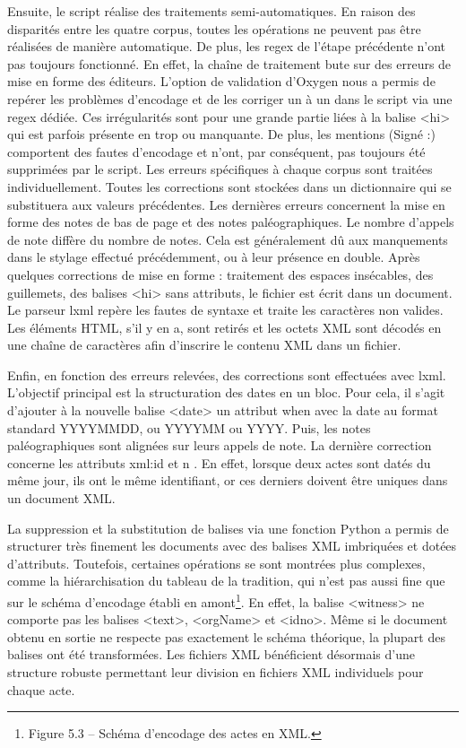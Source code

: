 \par Ensuite, le script réalise des traitements semi-automatiques. En raison des disparités entre les quatre corpus, toutes les opérations ne peuvent pas être réalisées de manière automatique. De plus, les regex de l'étape précédente n'ont pas toujours fonctionné. En effet, la chaîne de traitement bute sur des erreurs de mise en forme des éditeurs. L'option de validation d'Oxygen nous a permis de repérer les problèmes d'encodage et de les corriger un à un dans le script via une regex dédiée. Ces irrégularités sont pour une grande partie liées à la balise <hi> qui est parfois présente en trop ou manquante. De plus, les mentions \og (Signé :) \fg \space comportent des fautes d'encodage et n'ont, par conséquent, pas toujours été supprimées par le script. Les erreurs spécifiques à chaque corpus sont traitées individuellement. Toutes les corrections sont stockées dans un dictionnaire qui se substituera aux valeurs précédentes. Les dernières erreurs concernent la mise en forme des notes de bas de page et des notes paléographiques. Le nombre d'appels de note diffère du nombre de notes. Cela est généralement dû aux manquements dans le stylage effectué précédemment, ou à leur présence en double. Après quelques corrections de mise en forme : traitement des espaces insécables, des guillemets, des balises <hi> sans attributs, le fichier est écrit dans un document. Le parseur lxml repère les fautes de syntaxe et traite les caractères non valides. Les éléments HTML, s'il y en a, sont retirés et les octets XML sont décodés en une chaîne de caractères afin d'inscrire le contenu XML dans un fichier.
\newline 

\par Enfin, en fonction des erreurs relevées, des corrections sont effectuées avec lxml. L'objectif principal est la structuration des dates en un bloc. Pour cela, il s'agit d'ajouter à la nouvelle balise <date> un attribut \og when \fg \space avec la date au format standard YYYYMMDD, ou YYYYMM ou YYYY. Puis, les notes paléographiques sont alignées sur leurs appels de note. La dernière correction concerne les attributs \og xml:id \fg \space et \og n \fg. En effet, lorsque deux actes sont datés du même jour, ils ont le même identifiant, or ces derniers doivent être uniques dans un document XML.
\newline 

\par La suppression et la substitution de balises via une fonction Python a permis de structurer très finement les documents avec des balises XML imbriquées et dotées d'attributs. Toutefois, certaines opérations se sont montrées plus complexes, comme la hiérarchisation du tableau de la tradition, qui n'est pas aussi fine que sur le schéma d'encodage établi en amont\footnote{Figure 5.3 – Schéma d’encodage des actes en XML.}. En effet, la balise <witness> ne comporte pas les balises <text>, <orgName> et <idno>. Même si le document obtenu en sortie ne respecte pas exactement le schéma théorique, la plupart des balises ont été transformées. Les fichiers XML bénéficient désormais d'une structure robuste permettant leur division en fichiers XML individuels pour chaque acte.
\newpage 


